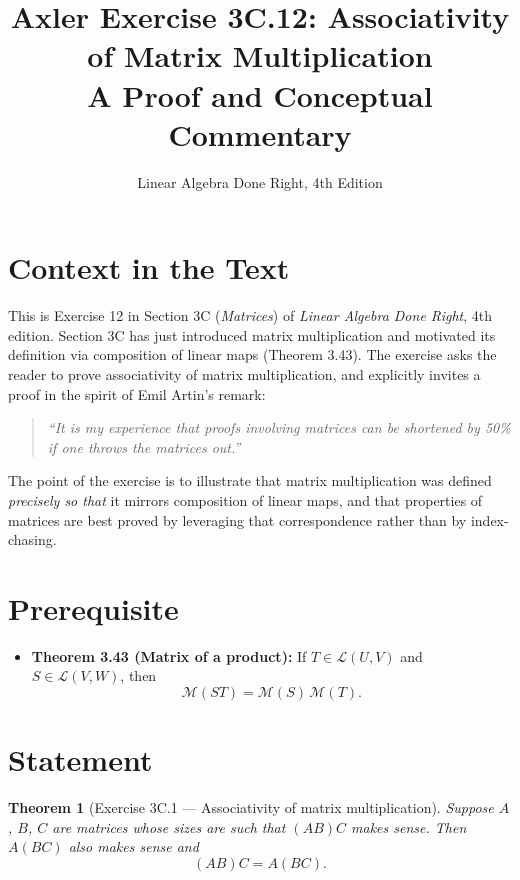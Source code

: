 \documentclass[12pt]{article}
\title{\textbf{Axler Exercise 3C.12: Associativity of Matrix Multiplication}\\
\large A Proof and Conceptual Commentary}
\author{Linear Algebra Done Right, 4th Edition}
\date{}
\newtheorem*{theorem}{Theorem}
\theoremstyle{remark}
\newcommand{\M}[1]{\mathcal{M}\!\left(#1\right)}
\newcommand{\Lc}{\mathcal{L}}
\begin{document}
 
\maketitle
 
\section*{Context in the Text}
 
This is Exercise 12 in Section 3C (\emph{Matrices}) of \emph{Linear Algebra Done
Right}, 4th edition. Section 3C has just introduced matrix multiplication and
motivated its definition via composition of linear maps (Theorem 3.43). The
exercise asks the reader to prove associativity of matrix multiplication, and
explicitly invites a proof in the spirit of Emil Artin's remark:
 
\begin{quote}
\itshape
``It is my experience that proofs involving matrices can be shortened by 50\%
if one throws the matrices out.''
\end{quote}
 
\noindent The point of the exercise is to illustrate that matrix multiplication
was defined \emph{precisely so that} it mirrors composition of linear maps, and
that properties of matrices are best proved by leveraging that correspondence
rather than by index-chasing.
 
\section*{Prerequisite}
 
\begin{itemize}
    \item \textbf{Theorem 3.43 (Matrix of a product):} If $T \in \Lc(U, V)$ and
          $S \in \Lc(V, W)$, then
          \[
              \M{ST} = \M{S}\,\M{T}.
          \]
\end{itemize}
 
\section*{Statement}
 
\begin{theorem}[Exercise 3C.1 --- Associativity of matrix multiplication]
Suppose $A$, $B$, $C$ are matrices whose sizes are such that $(AB)C$ makes
sense. Then $A(BC)$ also makes sense and
\[
    (AB)C = A(BC).
\]
\end{theorem}
 
\end{document}
